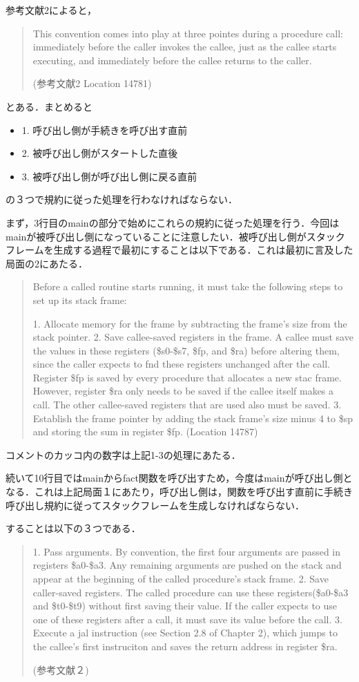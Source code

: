 \documentclass[a4j]{jarticle}
\begin{document}
参考文献2によると，

\begin{quote}
This convention comes into play at three pointes during a procedure call: immediately before the caller invokes the callee, just as the callee starts executing, and immediately before the callee returns to the caller.

(参考文献2 Location 14781)
\end{quote}

とある．まとめると

\begin{itemize}
\item1. 呼び出し側が手続きを呼び出す直前
\item2. 被呼び出し側がスタートした直後
\item3. 被呼び出し側が呼び出し側に戻る直前
\end{itemize}

の３つで規約に従った処理を行わなければならない．

まず，3行目のmainの部分で始めにこれらの規約に従った処理を行う．今回はmainが被呼び出し側になっていることに注意したい．被呼び出し側がスタックフレームを生成する過程で最初にすることは以下である．これは最初に言及した局面の2にあたる．

\begin{quote}
Before a called routine starts running, it must take the following steps to set up its stack frame:

1. Allocate memory for the frame by subtracting the frame's size from the stack pointer.
2. Save callee-saved registers in the frame. A callee must save the values in these registers (\$s0-\$s7, \$fp, and \$ra) before altering them, since the caller expects to fnd these registers unchanged after the call. Register \$fp is saved by every procedure that allocates a new stac frame. However, register \$ra only needs to be saved if the callee itself makes a call. The other callee-saved registers that are used also must be saved.
3. Establish the frame pointer by adding the stack frame's size minus 4 to \$sp and storing the sum in register \$fp.
(Location 14787)
\end{quote}

コメントのカッコ内の数字は上記1-3の処理にあたる．

続いて10行目ではmainからfact関数を呼び出すため，今度はmainが呼び出し側となる．これは上記局面１にあたり，呼び出し側は，関数を呼び出す直前に手続き呼び出し規約に従ってスタックフレームを生成しなければならない．

することは以下の３つである．

\begin{quote}
1. Pass arguments. By convention, the first four arguments are passed in registers \$a0-\$a3. Any remaining arguments are pushed on the stack and appear at the beginning of the called procedure's stack frame.
2. Save caller-saved registers. The called procedure can use these registers(\$a0-\$a3 and \$t0-\$t9) without first saving their value. If the caller expects to use one of these registers after a call, it must save its value before the call.
3. Execute a jal instruction (see Section 2.8 of Chapter 2), which jumps to the callee's first instruciton and saves the return address in register \$ra.  

(参考文献２)
\end{quote}
\end{document}
